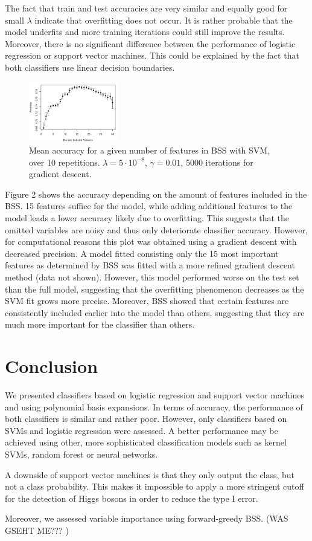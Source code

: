 \documentclass[10pt,conference,compsocconf]{IEEEtran}
\begin{document}
The fact that train and test accuracies are very similar and equally good for small $\lambda$ indicate that overfitting does not occur. It is rather probable that the model underfits and more training iterations could still improve the results. Moreover, there is no significant difference between the performance of logistic regression or support vector machines. This could be explained by the fact that both classifiers use linear decision boundaries.
\par
\begin{figure}[H]
	\centering
	\includegraphics[width=0.35\textwidth]{accuracy_plot.pdf}
	\caption{Mean accuracy for a given number of features in BSS with SVM, over 10 repetitions. $\lambda = 5 \cdot 10^{-8}$, $\gamma = 0.01$, 5000 iterations for gradient descent.}
\end{figure}
Figure 2 shows the accuracy depending on the amount of features included in the BSS. 15 features suffice for the model, while adding additional features to the model leads a lower accuracy likely due to overfitting. This suggests that the omitted variables are noisy and thus only deteriorate classifier accuracy.
However, for computational reasons this plot was obtained using a gradient descent with decreased precision. A model fitted consisting only the 15 most important features as determined by BSS was fitted with a more refined gradient descent method (data not shown). However, this model performed worse on the test set than the full model, suggesting that the overfitting phenomenon decreases as the SVM fit grows more precise.
Moreover, BSS showed that certain features are consistently included earlier into the model than others, suggesting that they are much more important for the classifier than others. 
\section*{Conclusion}
We presented classifiers based on logistic regression and support vector machines and using polynomial basis expansions. In terms of accuracy, the performance of both classifiers is similar and rather poor. However, only classifiers based on SVMs and logistic regression were assessed. A better performance may be achieved using other, more sophisticated classification models such as kernel SVMs, random forest or neural networks. 
\par
A downside of support vector machines is that they only output the class, but not a class probability. This makes it impossible to apply a more stringent cutoff for the detection of Higgs bosons in order to reduce the type I error. 
\par
Moreover, we assessed variable importance using forward-greedy BSS. (WAS GSEHT ME??? ) 


\end{document}

